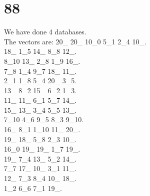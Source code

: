 \chapter{88}
\indent We have done 4 databases.\\
The vectors are:
20\_ 20\_ 10\_0 5\_1 2\_4 10\_.\\18\_ 1\_5 14\_ 8\_8 12\_.\\8\_10 13\_ 2\_8 1\_9 16\_.\\7\_8 1\_4 9\_7 18\_ 11\_.\\2\_1 1\_8 5\_4 20\_ 3\_5.\\13\_ 8\_2 15\_ 6\_2 1\_3.\\11\_ 11\_ 6\_1 5\_7 14\_.\\15\_ 13\_ 3\_4 5\_5 13\_.\\7\_10 4\_6 9\_5 8\_3 9\_10.\\16\_ 8\_1 1\_10 11\_ 20\_.\\19\_ 18\_ 5\_8 2\_3 10\_.\\16\_0 19\_ 19\_ 1\_7 19\_.\\19\_ 7\_4 13\_ 5\_2 14\_.\\7\_7 17\_ 10\_ 3\_1 11\_.\\12\_ 7\_3 8\_4 10\_ 18\_.\\1\_2 6\_6 7\_1 19\_.\\